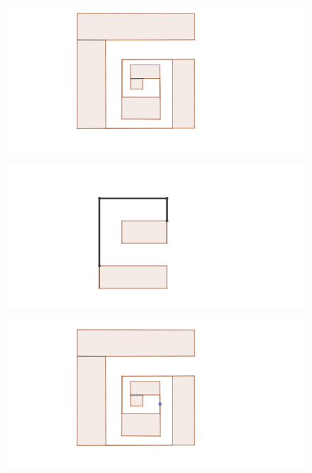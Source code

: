 \documentclass{beamer}
\begin{document}
\begin{frame}
\begin{figure}[h]
\includegraphics[width=\textwidth]{Poligono-con-planos-2}
\end{figure}
\end{frame}
\begin{frame}
\begin{figure}[h]
\includegraphics[width=\textwidth]{3-rectangulos-planos}
\end{figure}
\end{frame}
\begin{frame}
\begin{figure}[h]
\includegraphics[width=\textwidth]{Poligono-con-planos-3}
\end{figure}
\end{frame}
\end{document}
